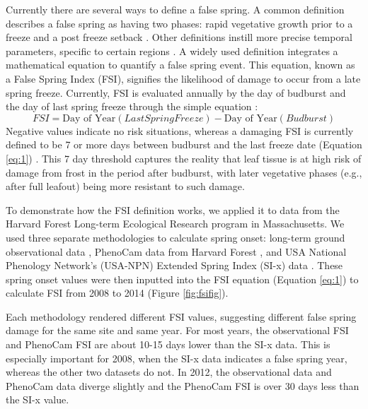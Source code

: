 \documentclass{article}\usepackage[]{graphicx}\usepackage[]{color}
\begin{document}
Currently there are several ways to define a false spring. A common definition describes a false spring as having two phases: rapid vegetative growth prior to a freeze and a post freeze setback \citep{Gu2008}. Other definitions instill more precise temporal parameters, specific to certain regions \citep[e.g., in][false spring for the Midwestern United States is defined as a warmer than average March, a freezing April, and enough growing degree days between budburst and the last freeze date]{Augspurger2013}. A widely used definition integrates a mathematical equation to quantify a false spring event. This equation, known as a False Spring Index (FSI), signifies the likelihood of damage to occur from a late spring freeze. Currently, FSI is evaluated annually by the day of budburst and the day of last spring freeze \citep[often calculated at -2.2$^{\circ}$C,][]{Schwartz1993} through the simple equation \citep{Marino2011}:
\begin{equation} \label{eq:1}
FSI = \text{Day of Year} (Last Spring Freeze) - \text{Day of Year} (Budburst)
\end{equation}
Negative values indicate no risk situations, whereas a damaging FSI is currently defined to be 7 or more days between budburst and the last freeze date (Equation \ref{eq:1}) \citep{Peterson2014}. This 7 day threshold captures the reality that leaf tissue is at high risk of damage from frost in the period after budburst, with later vegetative phases (e.g., after full leafout) being more resistant to such damage.%

To demonstrate how the FSI definition works, we applied it to data from the Harvard Forest Long-term Ecological Research program in Massachusetts. We used three separate methodologies to calculate spring onset: long-term ground observational data \citep{Okeefe2014}, PhenoCam data from Harvard Forest \citep{Richardson2015}, and USA National Phenology Network's (USA-NPN) Extended Spring Index (SI-x) data \citep{USA-NPN2016}. These spring onset values were then inputted into the FSI equation (Equation \ref{eq:1}) to calculate FSI from 2008 to 2014 (Figure \ref{fig:fsifig}). 

Each methodology rendered different FSI values, suggesting different false spring damage for the same site and same year. For most years, the observational FSI and PhenoCam FSI are about 10-15 days lower than the SI-x data. This is especially important for 2008, when the SI-x data indicates a false spring year, whereas the other two datasets do not. In 2012, the observational data and PhenoCam data diverge slightly and the PhenoCam FSI is over 30 days less than the SI-x value.
\end{document}
